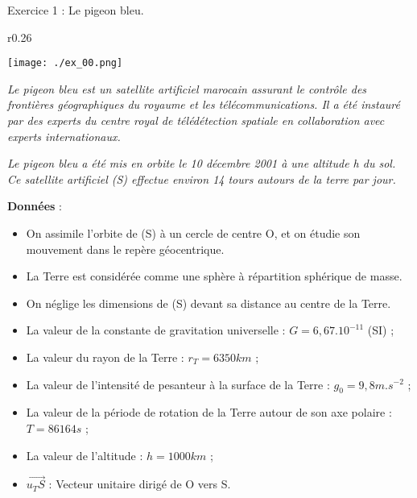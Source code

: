 \documentclass[12pt, french]{article}
\begin{document}
\begin{center}

\end{center}

\vspace{-0.2cm}
   \begin{Box2}{Exercice 1 : Le pigeon bleu.}

	\begin{wrapfigure}[4]{r}{0.26\textwidth}
  \begin{center}
	  \vspace{-0.6cm}
	\texttt{[image: ./ex\_00.png]}
  \end{center}
\end{wrapfigure}

\emph{ Le pigeon bleu est un satellite artificiel marocain assurant le contrôle des frontières
géographiques du royaume et les télécommunications. Il a été instauré par des
experts du centre royal de télédétection spatiale en collaboration avec experts
internationaux.}

\emph{Le pigeon bleu a été mis en orbite le 10 décembre 2001 à une altitude h du sol. \\Ce
satellite artificiel (S) effectue environ 14 tours autours de la terre par jour. }

\textbf{Données} : 

\begin{itemize}
	\item On assimile l’orbite de (S) à un cercle de centre O, et on étudie son mouvement
dans le repère géocentrique.
\item La Terre est considérée comme une sphère à répartition sphérique de masse.
\item  On néglige les dimensions de (S) devant sa distance au centre de la Terre.

\item La valeur de la constante de gravitation universelle : $G = 6,67.10^{-11}$ (SI) ;
\item  La valeur du rayon de la Terre : $r_T = 6350 km$ ;
\item  La valeur de l’intensité de pesanteur à la surface
	de la Terre : $g_0 = 9,8 m.s^{-2}$ ;
\item La valeur de la période de rotation de la Terre
autour de son axe polaire : $T = 86164 s$ ;
\item La valeur de l’altitude : $h = 1000 km$ ;
\item $\vec{u_TS}$ : Vecteur unitaire dirigé de O vers S.


\end{itemize}
\end{Box2}
\end{document}

